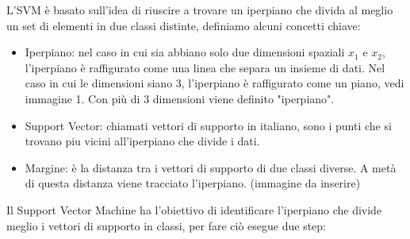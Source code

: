 \documentclass[12pt,italian]{report}
\begin{document}
L'SVM è basato sull'idea di riuscire a trovare un iperpiano che divida al meglio un set di elementi in due classi distinte, definiamo alcuni concetti chiave:

\begin{itemize}
	\item Iperpiano: nel caso in cui sia abbiano solo due dimensioni spaziali $x_1$ e $x_2$, l'iperpiano è raffigurato come una linea che separa un insieme di dati. Nel caso in cui le dimensioni siano 3, l'iperpiano è raffigurato come un piano, vedi immagine 1.
	Con più di 3 dimensioni viene definito "iperpiano".
	\item Support Vector: chiamati vettori di supporto in italiano, sono i punti che si trovano piu vicini all'iperpiano che divide i dati.
	\item Margine: è la distanza tra i vettori di supporto di due classi diverse. A metà di questa distanza viene tracciato l'iperpiano. (immagine da inserire)
\end{itemize}

Il Support Vector Machine ha l'obiettivo di identificare l'iperpiano che divide meglio i vettori di supporto in classi, per fare ciò esegue due step:
\end{document}
